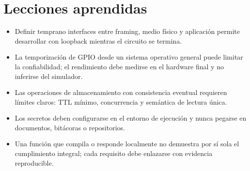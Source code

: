 \documentclass[12pt,a4paper]{article}
\begin{document}
\section{Lecciones aprendidas}
\begin{itemize}
  \item Definir temprano interfaces entre framing, medio físico y aplicación permite desarrollar con loopback mientras el circuito se termina.
  \item La temporización de GPIO desde un sistema operativo general puede limitar la confiabilidad; el rendimiento debe medirse en el hardware final y no inferirse del simulador.
  \item Las operaciones de almacenamiento con consistencia eventual requieren límites claros: TTL mínimo, concurrencia y semántica de lectura única.
  \item Los secretos deben configurarse en el entorno de ejecución y nunca pegarse en documentos, bitácoras o repositorios.
  \item Una función que compila o responde localmente no demuestra por sí sola el cumplimiento integral; cada requisito debe enlazarse con evidencia reproducible.
\end{itemize}
\end{document}

